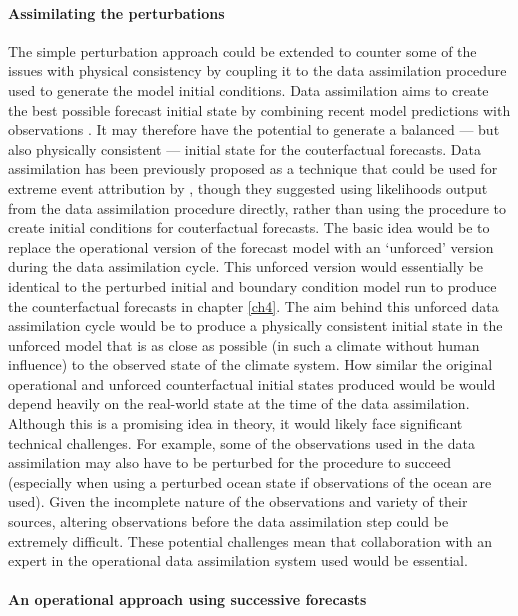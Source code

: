     \paragraph*{Assimilating the perturbations}

      The simple perturbation approach could be extended to counter some of the issues with physical consistency by coupling it to the data assimilation procedure used to generate the model initial conditions. Data assimilation aims to create the best possible forecast initial state by combining recent model predictions with observations \citep{kalman_new_1960}. It may therefore have the potential to generate a balanced --- but also physically consistent --- initial state for the couterfactual forecasts. Data assimilation has been previously proposed as a technique that could be used for extreme event attribution by \citet{hannart_dada_2016}, though they suggested using likelihoods output from the data assimilation procedure directly, rather than using the procedure to create initial conditions for couterfactual forecasts. The basic idea would be to replace the operational version of the forecast model with an `unforced' version during the data assimilation cycle. This unforced version would essentially be identical to the perturbed initial and boundary condition model run to produce the counterfactual forecasts in chapter \ref{ch4}. The aim behind this unforced data assimilation cycle would be to produce a physically consistent initial state in the unforced model that is as close as possible (in such a climate without human influence) to the observed state of the climate system. How similar the original operational and unforced counterfactual initial states produced would be would depend heavily on the real-world state at the time of the data assimilation. Although this is a promising idea in theory, it would likely face significant technical challenges. For example, some of the observations used in the data assimilation may also have to be perturbed for the procedure to succeed (especially when using a perturbed ocean state if observations of the ocean are used). Given the incomplete nature of the observations and variety of their sources, altering observations before the data assimilation step could be extremely difficult. These potential challenges mean that collaboration with an expert in the operational data assimilation system used would be essential.

    \paragraph*{An operational approach using successive forecasts}

